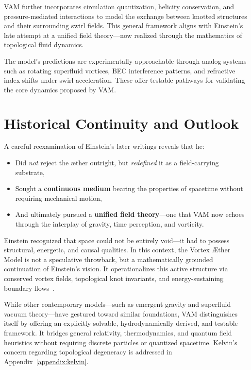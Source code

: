 \documentclass[preprint,notitlepage]{revtex4-2}
\begin{document}
VAM further incorporates circulation quantization, helicity conservation, and pressure-mediated interactions to model the exchange between knotted structures and their surrounding swirl fields. This general framework aligns with Einstein’s late attempt at a unified field theory—now realized through the mathematics of topological fluid dynamics.

The model's predictions are experimentally approachable through analog systems such as rotating superfluid vortices, BEC interference patterns, and refractive index shifts under swirl acceleration. These offer testable pathways for validating the core dynamics proposed by VAM.


  \section{Historical Continuity and Outlook}

A careful reexamination of Einstein's later writings reveals that he:
\begin{itemize}
    \item Did \emph{not} reject the æther outright, but \emph{redefined} it as a field-carrying substrate,
    \item Sought a \textbf{continuous medium} bearing the properties of spacetime without requiring mechanical motion,
    \item And ultimately pursued a \textbf{unified field theory}—one that VAM now echoes through the interplay of gravity, time perception, and vorticity.
\end{itemize}

Einstein recognized that space could not be entirely void—it had to possess structural, energetic, and causal qualities. In this context, the Vortex Æther Model is not a speculative throwback, but a mathematically grounded continuation of Einstein's vision. It operationalizes this active structure via conserved vortex fields, topological knot invariants, and energy-sustaining boundary flows~\cite{iskandarani2025vam1, iskandarani2025vam2}.

While other contemporary models—such as emergent gravity and superfluid vacuum theory—have gestured toward similar foundations, VAM distinguishes itself by offering an explicitly solvable, hydrodynamically derived, and testable framework. It bridges general relativity, thermodynamics, and quantum field heuristics without requiring discrete particles or quantized spacetime.
Kelvin's concern regarding topological degeneracy is addressed in Appendix~\ref{appendix:kelvin}.
\end{document}
